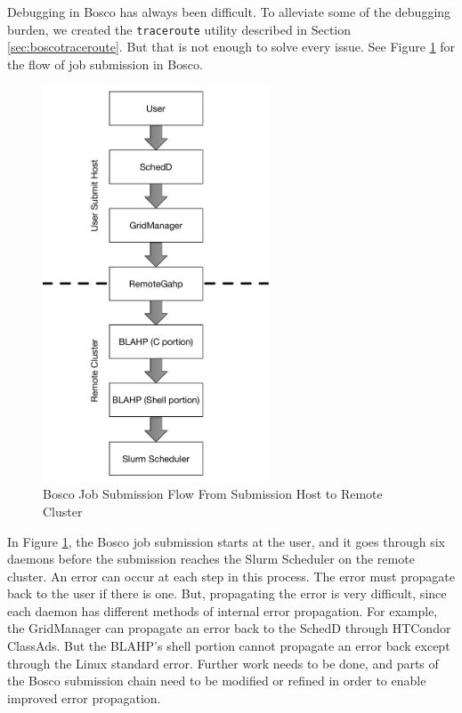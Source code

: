Debugging in Bosco has always been difficult.  To alleviate some of the debugging burden, we created the \texttt{traceroute} utility described in Section \ref{sec:boscotraceroute}.  But that is not enough to solve every issue.  See Figure \ref{fig:boscojobsubmitflowconclusion} for the flow of job submission in Bosco.

\begin{figure}[h!t]
	\centering
	\includegraphics[width=0.6\textwidth]{images/JobSubmitFlow.pdf}
	\caption{Bosco Job Submission Flow From Submission Host to Remote Cluster}
	\label{fig:boscojobsubmitflowconclusion}
\end{figure}

In Figure \ref{fig:boscojobsubmitflowconclusion}, the Bosco job submission starts at the user, and it goes through six daemons before the submission reaches the Slurm Scheduler on the remote cluster.  An error can occur at each step in this process.  The error must propagate back to the user if there is one.  But, propagating the error is very difficult, since each daemon has different methods of internal error propagation.  For example, the GridManager can propagate an error back to the SchedD through HTCondor ClassAds.  But the BLAHP's shell portion cannot propagate an error back except through the Linux standard error.  Further work needs to be done, and parts of the Bosco submission chain need to be modified or refined in order to enable improved error propagation.

